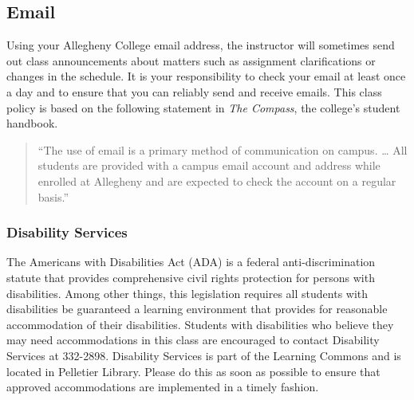 \documentclass[11pt]{article} %
\begin{document}


\subsection*{\textbf{Email}}

Using your Allegheny College email address, the instructor will sometimes send out class announcements about matters such as assignment clarifications or changes in the schedule. It is your responsibility to check your email at least once a day and to ensure that you can reliably send and receive emails. This class policy is based on the following statement in {\em The Compass}, the college's student handbook.

\vspace*{-.1in}
\begin{quote}
  ``The use of email is a primary method of communication on campus. \ldots  
All students are provided with a campus email account and address while
  enrolled at Allegheny and are expected to check the account on a regular
  basis.'' 
\end{quote}
\vspace*{-.1in}

\subsubsection*{\textbf{Disability Services}}

The Americans with Disabilities Act (ADA) is a federal anti-discrimination statute that provides comprehensive civil rights protection for persons with disabilities.  Among other things, this legislation requires all students with disabilities be guaranteed a learning environment that provides for reasonable accommodation of their disabilities. Students with disabilities who believe they may need accommodations in this class are encouraged to contact Disability Services at 332-2898.  Disability Services is part of the Learning Commons and is located in Pelletier Library. Please do this as soon as possible to ensure that approved accommodations are implemented in a timely fashion.
\end{document}
